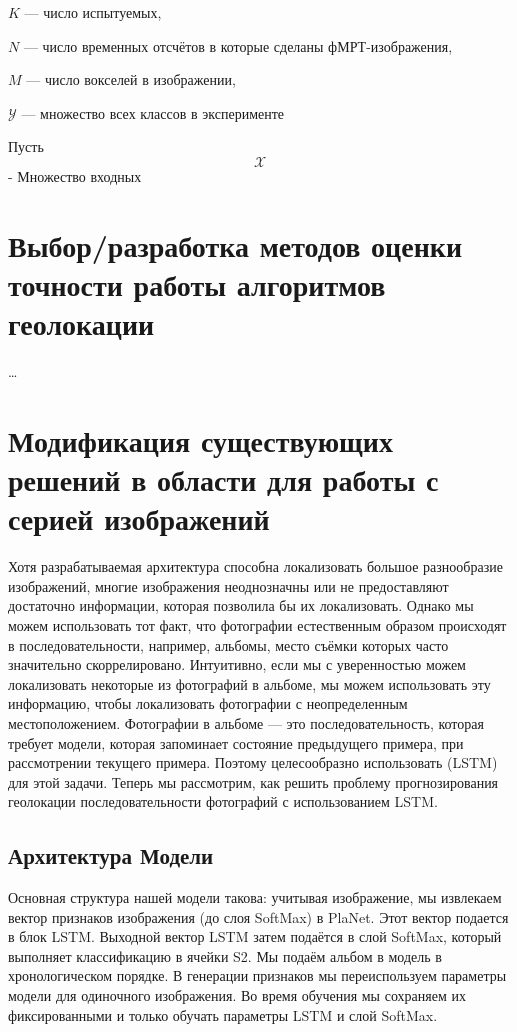 \begin{compactitem}
	
	\item $K$ --- число испытуемых,
	\item $N$ --- число временных отсчётов в которые сделаны фМРТ-изображения,
	\item $M$ --- число вокселей в изображении,
	\item $\mathcal{Y}$ --- множество всех классов в эксперименте
	
\end{compactitem}
Пусть \[\mathcal{X}\] - Множество входных

\section{Выбор/разработка методов оценки точности работы алгоритмов геолокации}

\dots


\section{Модификация существующих решений в области для работы с серией изображений}

Хотя разрабатываемая архитектура способна локализовать большое разнообразие изображений, многие изображения неоднозначны или не предоставляют достаточно информации, которая позволила бы их локализовать.
Однако мы можем использовать тот факт, что фотографии естественным образом происходят в последовательности, например, альбомы, место съёмки которых часто значительно скоррелировано. Интуитивно, если мы с уверенностью можем локализовать
некоторые из фотографий в альбоме, мы можем использовать эту информацию,
чтобы локализовать фотографии с неопределенным местоположением. Фотографии в альбоме --- это последовательность,
которая требует модели, которая запоминает состояние предыдущего примера, 
при рассмотрении текущего примера. Поэтому целесообразно использовать
(LSTM) \cite{hochreiter1997long} для этой задачи.
Теперь мы рассмотрим, как решить проблему прогнозирования
геолокации последовательности фотографий с использованием LSTM.

\subsection{Архитектура Модели}
Основная структура нашей модели такова:
учитывая изображение, мы извлекаем вектор признаков изображения (до слоя SoftMax) в PlaNet. Этот вектор подается в блок LSTM. Выходной вектор LSTM затем подаётся в слой SoftMax, который
выполняет классификацию в ячейки S2. Мы подаём альбом в модель в хронологическом порядке. В генерации признаков мы переиспользуем параметры модели для одиночного изображения. Во время обучения мы сохраняем их фиксированными и только обучать параметры LSTM и слой SoftMax.

